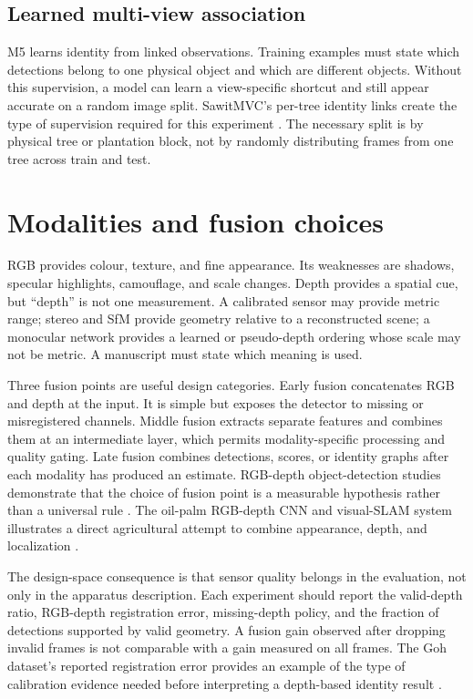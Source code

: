\subsection{Learned multi-view association}

M5 learns identity from linked observations. Training examples must state which detections belong to one physical object and which are different objects. Without this supervision, a model can learn a view-specific shortcut and still appear accurate on a random image split. SawitMVC's per-tree identity links create the type of supervision required for this experiment \cite{indriani2026sawitmvc}. The necessary split is by physical tree or plantation block, not by randomly distributing frames from one tree across train and test.

\section{Modalities and fusion choices}
\label{sec:fusion2}

RGB provides colour, texture, and fine appearance. Its weaknesses are shadows, specular highlights, camouflage, and scale changes. Depth provides a spatial cue, but ``depth'' is not one measurement. A calibrated sensor may provide metric range; stereo and SfM provide geometry relative to a reconstructed scene; a monocular network provides a learned or pseudo-depth ordering whose scale may not be metric. A manuscript must state which meaning is used.

Three fusion points are useful design categories. Early fusion concatenates RGB and depth at the input. It is simple but exposes the detector to missing or misregistered channels. Middle fusion extracts separate features and combines them at an intermediate layer, which permits modality-specific processing and quality gating. Late fusion combines detections, scores, or identity graphs after each modality has produced an estimate. RGB-depth object-detection studies demonstrate that the choice of fusion point is a measurable hypothesis rather than a universal rule \cite{ophoff2019multimodal}. The oil-palm RGB-depth CNN and visual-SLAM system illustrates a direct agricultural attempt to combine appearance, depth, and localization \cite{siong2021rgbdepthpalm}.

The design-space consequence is that sensor quality belongs in the evaluation, not only in the apparatus description. Each experiment should report the valid-depth ratio, RGB-depth registration error, missing-depth policy, and the fraction of detections supported by valid geometry. A fusion gain observed after dropping invalid frames is not comparable with a gain measured on all frames. The Goh dataset's reported registration error provides an example of the type of calibration evidence needed before interpreting a depth-based identity result \cite{goh2025palmdataset}.

